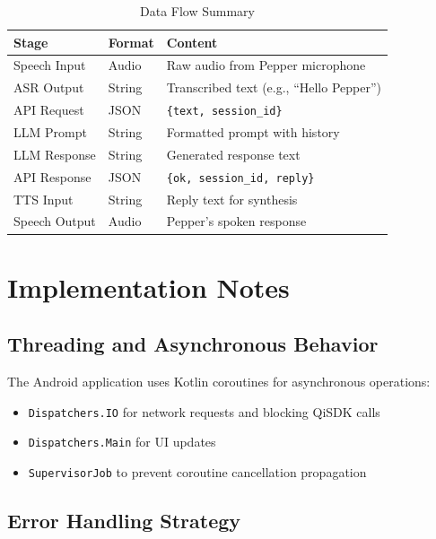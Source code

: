 \documentclass[a4paper]{article}
\begin{document}
\begin{table}[htbp]
    \centering
    \caption{Data Flow Summary}
    \label{tab:dataflow}
    \begin{tabular}{@{}llp{6cm}@{}}
        \toprule
        \textbf{Stage} & \textbf{Format} & \textbf{Content} \\
        \midrule
        Speech Input & Audio & Raw audio from Pepper microphone \\
        ASR Output & String & Transcribed text (e.g., ``Hello Pepper'') \\
        API Request & JSON & \texttt{\{text, session\_id\}} \\
        LLM Prompt & String & Formatted prompt with history \\
        LLM Response & String & Generated response text \\
        API Response & JSON & \texttt{\{ok, session\_id, reply\}} \\
        TTS Input & String & Reply text for synthesis \\
        Speech Output & Audio & Pepper's spoken response \\
        \bottomrule
    \end{tabular}
\end{table}

\section{Implementation Notes}

\subsection{Threading and Asynchronous Behavior}

The Android application uses Kotlin coroutines for asynchronous operations:
\begin{itemize}[noitemsep]
    \item \texttt{Dispatchers.IO} for network requests and blocking QiSDK calls
    \item \texttt{Dispatchers.Main} for UI updates
    \item \texttt{SupervisorJob} to prevent coroutine cancellation propagation
\end{itemize}

\subsection{Error Handling Strategy}
\end{document}
